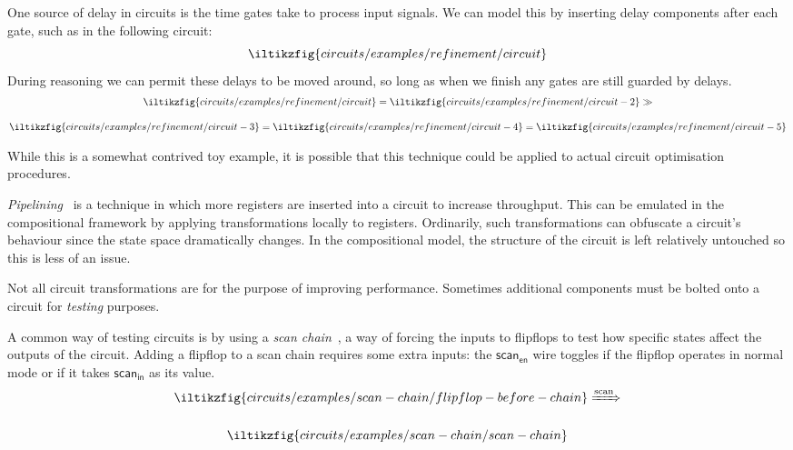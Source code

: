 \begin{example}
    One source of delay in circuits is the time gates take to process input
    signals.
    We can model this by inserting delay components after each gate, such as in
    the following circuit:
    \[
        \iltikzfig{circuits/examples/refinement/circuit}
    \]
    During reasoning we can permit these delays to be moved around, so long as
    when we finish any gates are still guarded by delays.
    \begin{gather*}
        \iltikzfig{circuits/examples/refinement/circuit}
        =
        \iltikzfig{circuits/examples/refinement/circuit-2}
        \gg
        \\[1em]
        \iltikzfig{circuits/examples/refinement/circuit-3}
        =
        \iltikzfig{circuits/examples/refinement/circuit-4}
        =
        \iltikzfig{circuits/examples/refinement/circuit-5}
    \end{gather*}
\end{example}

While this is a somewhat contrived toy example, it is possible that this
technique could be applied to actual circuit optimisation procedures.

\begin{example}[Pipelining]
    \emph{Pipelining}~\cite{parhi1999vlsi} is a technique in which more
    registers are inserted into a circuit to increase throughput.
    This can be emulated in the compositional framework by applying
    transformations locally to registers.
    Ordinarily, such transformations can obfuscate a circuit's behaviour since
    the state space dramatically changes.
    In the compositional model, the structure of the circuit is left relatively
    untouched so this is less of an issue.
\end{example}

Not all circuit transformations are for the purpose of improving performance.
Sometimes additional components must be bolted onto a circuit for \emph{testing}
purposes.

\begin{example}
    A common way of testing circuits is by using a
    \emph{scan chain}~\cite{mourad2000principles}, a way of forcing the
    inputs to flipflops to test how specific states affect the outputs of the
    circuit.
    Adding a flipflop to a scan chain requires some extra inputs: the
    \(\mathsf{scan}_\mathsf{en}\) wire toggles if the flipflop operates in
    normal mode or if it takes \(\mathsf{scan}_\mathsf{in}\) as its value.
    \begin{gather*}
        \iltikzfig{circuits/examples/scan-chain/flipflop-before-chain}
        \xRightarrow{\text{scan}}
        \\[1em]
        \iltikzfig{circuits/examples/scan-chain/scan-chain}
    \end{gather*}
\end{example}

